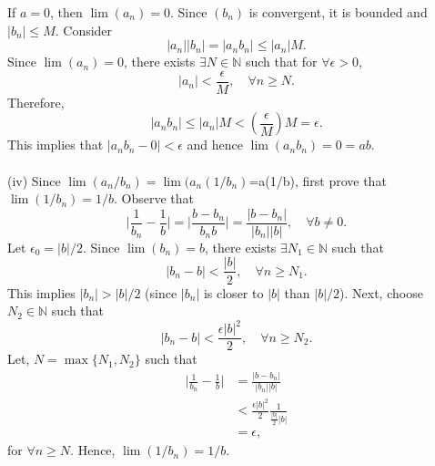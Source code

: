 \documentclass{article}
\begin{document}
                If $a=0$, then $\lim(a_n)=0$. Since $(b_n)$ is convergent, it is bounded and $|b_n| \leq M$. Consider
                \begin{equation*}
                    |a_n||b_n| = |a_nb_n| \leq |a_n|M.
                \end{equation*}
                Since $\lim (a_n)=0$, there exists $\exists N \in \mathbb{N}$ such that for $\forall \epsilon > 0$,
                \begin{equation*}
                    |a_n| < \frac{\epsilon}{M}, \quad \forall n \geq N.
                \end{equation*}
                Therefore,
                \begin{equation*}
                    |a_nb_n| \leq |a_n|M < (\frac{\epsilon}{M})M = \epsilon.
                \end{equation*}
                This implies that $|a_nb_n-0|<\epsilon$ and hence $\lim(a_nb_n)=0=ab$.
                \\ \\
                (iv) Since $\lim(a_n/b_n)=\lim(a_n(1/b_n)$=a(1/b), first prove that $\lim(1/b_n)=1/b$. Observe that
                \begin{equation*}
                    \bigg| \frac{1}{b_n} - \frac{1}{b} \bigg| = \bigg| \frac{b-b_n}{b_nb} \bigg| = \frac{|b-b_n|}{|b_n||b|}, \quad \forall b \neq 0.
                \end{equation*}
                Let $\epsilon_0=|b|/2$. Since $\lim (b_n)=b$, there exists $\exists N_1 \in \mathbb{N}$ such that
                \begin{equation*}
                    |b_n - b| < \frac{|b|}{2}, \quad \forall n \geq N_1.
                \end{equation*}
                This implies $|b_n| > |b|/2$ (since $|b_n|$ is closer to $|b|$ than $|b|/2$). Next, choose $N_2 \in \mathbb{N}$ such that
                \begin{equation*}
                    |b_n-b| < \frac{\epsilon|b|^2}{2}, \quad \forall n \geq N_2.
                \end{equation*}
                Let, $N = \max \{N_1,N_2\}$ such that
                \begin{align*}
                    \bigg| \frac{1}{b_n} - \frac{1}{b} \bigg| & = \frac{|b-b_n|}{|b_n||b|}\\
                    & < \frac{\epsilon|b|^2}{2} \frac{1}{\frac{|b|}{2}|b|} \\
                    & = \epsilon,
                \end{align*}
                for $\forall n \geq N$. Hence, $\lim(1/b_n)=1/b$.
                
\end{document}
